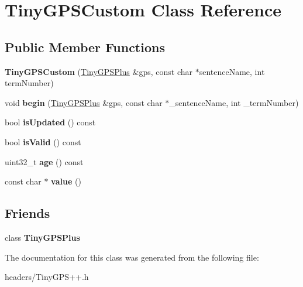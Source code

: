 \hypertarget{class_tiny_g_p_s_custom}{}\section{Tiny\+G\+P\+S\+Custom Class Reference}
\label{class_tiny_g_p_s_custom}
\subsection*{Public Member Functions}
\begin{DoxyCompactItemize}
\item 
{\bfseries Tiny\+G\+P\+S\+Custom} (\hyperlink{class_tiny_g_p_s_plus}{Tiny\+G\+P\+S\+Plus} \&gps, const char $\ast$sentence\+Name, int term\+Number)\hypertarget{class_tiny_g_p_s_custom_a29b2a658bf95d8e6265e983b1c0251b5}{}\label{class_tiny_g_p_s_custom_a29b2a658bf95d8e6265e983b1c0251b5}

\item 
void {\bfseries begin} (\hyperlink{class_tiny_g_p_s_plus}{Tiny\+G\+P\+S\+Plus} \&gps, const char $\ast$\+\_\+sentence\+Name, int \+\_\+term\+Number)\hypertarget{class_tiny_g_p_s_custom_a3bf972f7e2e7e3f483071630e5ca8355}{}\label{class_tiny_g_p_s_custom_a3bf972f7e2e7e3f483071630e5ca8355}

\item 
bool {\bfseries is\+Updated} () const \hypertarget{class_tiny_g_p_s_custom_a3905509b3f88d67e248855c135744b14}{}\label{class_tiny_g_p_s_custom_a3905509b3f88d67e248855c135744b14}

\item 
bool {\bfseries is\+Valid} () const \hypertarget{class_tiny_g_p_s_custom_a06fad8448c014424bf96ed379b55da21}{}\label{class_tiny_g_p_s_custom_a06fad8448c014424bf96ed379b55da21}

\item 
uint32\+\_\+t {\bfseries age} () const \hypertarget{class_tiny_g_p_s_custom_a9bacaf774b1dba9ad942435d3ed1c2cc}{}\label{class_tiny_g_p_s_custom_a9bacaf774b1dba9ad942435d3ed1c2cc}

\item 
const char $\ast$ {\bfseries value} ()\hypertarget{class_tiny_g_p_s_custom_ac5ad40a3d9b6fe386b2309f972566674}{}\label{class_tiny_g_p_s_custom_ac5ad40a3d9b6fe386b2309f972566674}

\end{DoxyCompactItemize}
\subsection*{Friends}
\begin{DoxyCompactItemize}
\item 
class {\bfseries Tiny\+G\+P\+S\+Plus}\hypertarget{class_tiny_g_p_s_custom_a6501fd5ef19ae166d43e0e5781609ee2}{}\label{class_tiny_g_p_s_custom_a6501fd5ef19ae166d43e0e5781609ee2}

\end{DoxyCompactItemize}


The documentation for this class was generated from the following file\+:\begin{DoxyCompactItemize}
\item 
headers/Tiny\+G\+P\+S++.\+h\end{DoxyCompactItemize}
